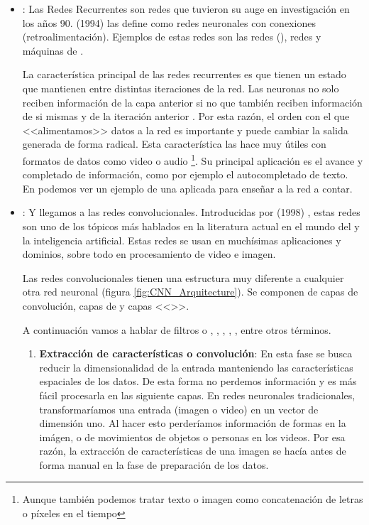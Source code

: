 \begin{itemize}
  \item \textbf{}: Las Redes Recurrentes son redes que tuvieron su auge en investigación en los años 90.  (1994)  las define como redes neuronales con conexiones  (retroalimentación). Ejemplos de estas redes son las redes  (), redes  y máquinas de  .

        La característica principal de las redes recurrentes es que tienen un estado que mantienen entre distintas iteraciones de la red. Las neuronas no solo reciben información de la capa anterior si no que también reciben información de si mismas y de la iteración anterior . Por esta razón, el orden con el que <<alimentamos>> datos a la red es importante y puede cambiar la salida generada de forma radical. Esta característica las hace muy útiles con formatos de datos como video o audio \footnote{Aunque también podemos tratar texto o imagen como concatenación de letras o píxeles en el tiempo}. Su principal aplicación es el avance y completado de información, como por ejemplo el autocompletado de texto.  En  podemos ver un ejemplo de una  aplicada para enseñar a la red a contar.

  \item \textbf{}: Y llegamos a las redes convolucionales. Introducidas por  (1998) , estas redes son uno de los tópicos más hablados en la literatura actual en el mundo del  y la inteligencia artificial. Estas redes se usan en muchísimas aplicaciones y dominios, sobre todo en procesamiento de video e imagen.

        Las redes convolucionales tienen una estructura muy diferente a cualquier otra red neuronal (figura \ref{fig:CNN_Arquitecture}). Se componen de capas de convolución, capas de  y capas <<>>.


        A continuación vamos a hablar de filtros o , , , , , entre otros términos.

        \begin{enumerate}
          \item \textbf{Extracción de características o convolución}: En esta fase se busca reducir la dimensionalidad de la entrada manteniendo las características espaciales de los datos. De esta forma no perdemos información y es más fácil procesarla en las siguiente capas. En redes neuronales tradicionales, transformaríamos una entrada (imagen o video) en un vector de dimensión uno. Al hacer esto perderíamos información de formas en la imágen, o de movimientos de objetos o personas en los videos. Por esa razón, la extracción de características de una imagen se hacía antes de forma manual en la fase de preparación de los datos.


\end{enumerate}
\end{itemize}

